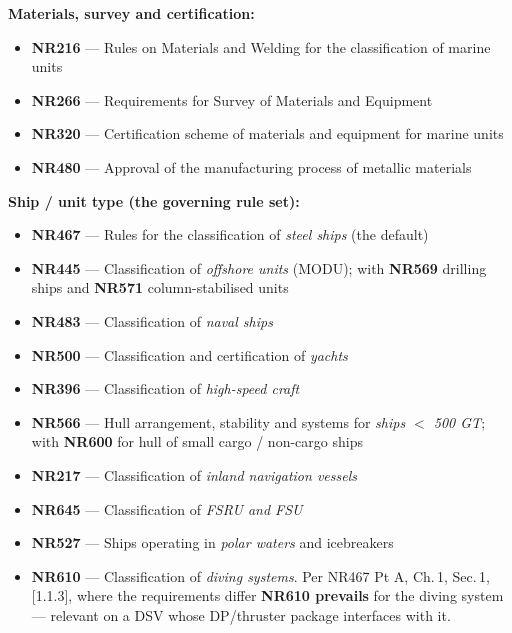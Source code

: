 \documentclass[11pt,a4paper]{report}
\begin{document}
\textbf{Materials, survey and certification:}
\begin{itemize}[leftmargin=*]
\item \textbf{NR216} --- Rules on Materials and Welding for the classification of marine units
\item \textbf{NR266} --- Requirements for Survey of Materials and Equipment
\item \textbf{NR320} --- Certification scheme of materials and equipment for marine units
\item \textbf{NR480} --- Approval of the manufacturing process of metallic materials
\end{itemize}

\textbf{Ship / unit type (the governing rule set):}
\begin{itemize}[leftmargin=*]
\item \textbf{NR467} --- Rules for the classification of \emph{steel ships} (the default)
\item \textbf{NR445} --- Classification of \emph{offshore units} (MODU); with
\textbf{NR569} drilling ships and \textbf{NR571} column-stabilised units
\item \textbf{NR483} --- Classification of \emph{naval ships}
\item \textbf{NR500} --- Classification and certification of \emph{yachts}
\item \textbf{NR396} --- Classification of \emph{high-speed craft}
\item \textbf{NR566} --- Hull arrangement, stability and systems for \emph{ships $<$ 500 GT};
with \textbf{NR600} for hull of small cargo / non-cargo ships
\item \textbf{NR217} --- Classification of \emph{inland navigation vessels}
\item \textbf{NR645} --- Classification of \emph{FSRU and FSU}
\item \textbf{NR527} --- Ships operating in \emph{polar waters} and icebreakers
\item \textbf{NR610} --- Classification of \emph{diving systems}. Per NR467 Pt A,
Ch.\,1, Sec.\,1, [1.1.3], where the requirements differ \textbf{NR610 prevails}
for the diving system --- relevant on a DSV whose DP/thruster package interfaces
with it.
\end{itemize}
\end{document}
